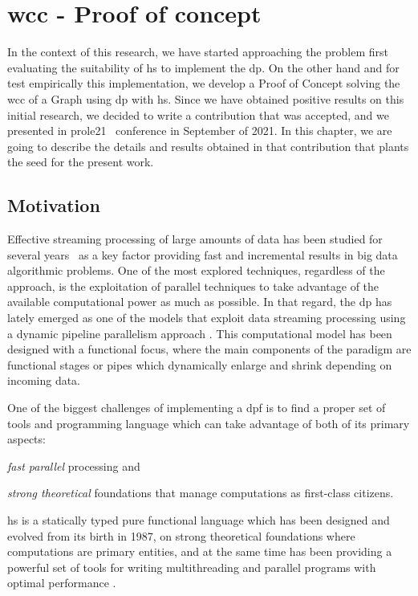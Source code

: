 \chapter{\acrshort{wcc} - Proof of concept}\label{prole}
In the context of this research, we have started approaching the problem first evaluating the suitability of \acrlong{hs}
to implement the \acrlong{dp}. On the other hand and for test empirically this implementation, we develop a Proof of Concept solving the \acrlong{wcc} of a Graph using \acrlong{dp} with \acrshort{hs}.
Since we have obtained positive results on this initial research, we decided to write a contribution that was accepted, and we presented in \acrshort{prole21}~\cite{prole21} conference in September of 2021.
In this chapter, we are going to describe the details and results obtained in that contribution that plants the seed for the present work.

\section{Motivation}
Effective streaming processing of large amounts of data has been studied for several years~\cite{enumeratingsg, exploiting, onthefly} as a key factor providing fast and incremental results in big data algorithmic problems. 
One of the most explored techniques, regardless of the approach, is the exploitation of parallel techniques to take advantage of the available computational power as much as possible. 
In that regard, the \acrfull{dp} \cite{dpdef} has lately emerged as one of the models that exploit data streaming processing using a dynamic pipeline parallelism approach \cite{onthefly}. 
This computational model has been designed with a functional focus, where the main components of the paradigm are functional stages or pipes which dynamically enlarge and shrink depending on incoming data.  

One of the biggest challenges of implementing a \acrfull{dpf} is to find a proper set of tools and programming language which can take advantage of both of its primary aspects: \begin{inparaenum}[i\upshape)]
\item  \emph{fast parallel} processing and 
\item  \emph{strong theoretical} foundations that manage computations as first-class citizens.
 \end{inparaenum}
\acrfull{hs} is a statically typed pure functional language which has been designed and evolved from its birth in 1987, on strong theoretical foundations where computations are primary entities, 
and at the same time has been providing a powerful set of tools for writing multithreading and parallel programs with optimal performance \cite{parallelbook, monadpar}.


